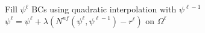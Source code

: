 \documentclass[10pt]{article}
\begin{document}
\begin{algorithm}
\begin{algorithmic}[1]
\State Fill $\psi^\ell$ BCs using quadratic interpolation with $\psi^{\ell-1}$
\State $\psi^\ell = \psi^\ell + \lambda (N^{nf}(\psi^\ell, \psi^{\ell-1}) - r^\ell)$ on $\Omega^\ell$
\EndProcedure




\end{algorithmic}
\end{algorithm}




\end{document}
